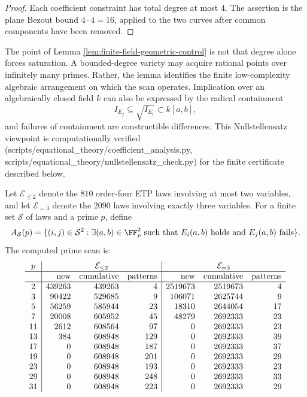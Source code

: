 \begin{proof}
Each coefficient constraint has total degree at most \(4\).  The assertion is
the plane Bezout bound \(4\cdot 4=16\), applied to the two curves after common
components have been removed.
\end{proof}

The point of Lemma \ref{lem:finite-field-geometric-control} is not that degree
alone forces saturation.  A bounded-degree variety may acquire rational points
over infinitely many primes.  Rather, the lemma identifies the finite
low-complexity algebraic arrangement on which the scan operates.  Implication
over an algebraically closed field \(k\) can also be expressed by the radical
containment
\[
    I_{E_j}\subseteq \sqrt{I_{E_i}}\subset k[a,b],
\]
and failures of containment are constructible differences.  This
Nullstellensatz viewpoint is computationally verified (scripts/equational\_theory/coefficient\_analysis.py, scripts/equational\_theory/nullstellensatz\_check.py)
for the finite certificate described below.

Let \({\mathcal E}_{\leq 2}\) denote the \(810\) order-four ETP laws involving
at most two variables, and let \({\mathcal E}_{=3}\) denote the \(2090\) laws
involving exactly three variables.  For a finite set \({\mathcal S}\) of laws
and a prime \(p\), define
\[
    A_{\mathcal S}(p)=
    \{(i,j)\in{\mathcal S}^2:\exists(a,b)\in\FF_p^2
      \text{ such that }E_i(a,b)\text{ holds and }E_j(a,b)\text{ fails}\}.
\]
The computed prime scan is:
\[
\begin{array}{c|rrr|rrr}
p
& \multicolumn{3}{c|}{{\mathcal E}_{\leq 2}}
& \multicolumn{3}{c}{{\mathcal E}_{=3}}\\
\hline
& \text{new} & \text{cumulative} & \text{patterns}
& \text{new} & \text{cumulative} & \text{patterns}\\
\hline
2  & 439263 & 439263 & 4   & 2519673 & 2519673 & 4\\
3  & 90422  & 529685 & 9   & 106071  & 2625744 & 9\\
5  & 56259  & 585944 & 23  & 18310   & 2644054 & 17\\
7  & 20008  & 605952 & 45  & 48279   & 2692333 & 23\\
11 & 2612   & 608564 & 97  & 0       & 2692333 & 23\\
13 & 384    & 608948 & 129 & 0       & 2692333 & 39\\
17 & 0      & 608948 & 187 & 0       & 2692333 & 37\\
19 & 0      & 608948 & 201 & 0       & 2692333 & 29\\
23 & 0      & 608948 & 193 & 0       & 2692333 & 23\\
29 & 0      & 608948 & 248 & 0       & 2692333 & 33\\
31 & 0      & 608948 & 223 & 0       & 2692333 & 29
\end{array}
\]

